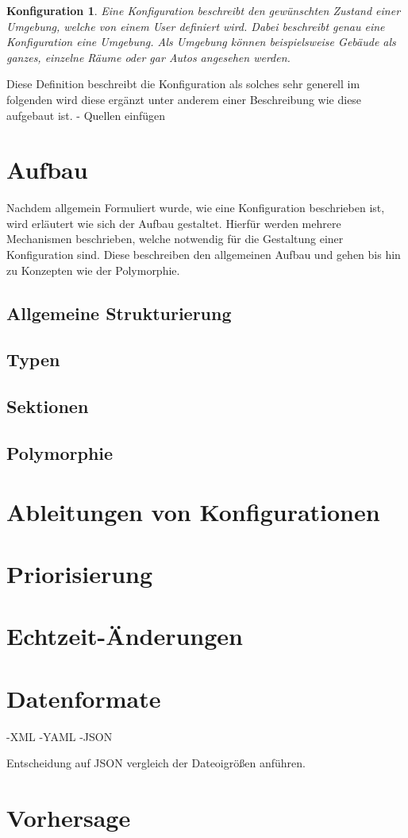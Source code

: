 \newtheorem{mydef}{Konfiguration}
\begin{mydef}
Eine Konfiguration beschreibt den gewünschten Zustand einer Umgebung, welche von einem User definiert wird. Dabei beschreibt genau eine Konfiguration eine Umgebung. Als
Umgebung können beispielsweise Gebäude als ganzes, einzelne Räume oder gar Autos angesehen werden.
\end{mydef}

Diese Definition beschreibt die Konfiguration als solches sehr generell im folgenden wird diese ergänzt unter anderem einer Beschreibung wie diese aufgebaut ist. 
- Quellen einfügen 

\section{Aufbau} 
Nachdem allgemein Formuliert wurde, wie eine Konfiguration beschrieben ist, wird erläutert wie sich der Aufbau gestaltet. Hierfür werden mehrere Mechanismen beschrieben, 
welche notwendig für die Gestaltung einer Konfiguration sind. Diese beschreiben den allgemeinen Aufbau und gehen bis hin zu Konzepten wie der Polymorphie. 


\subsection{Allgemeine Strukturierung}
\subsection{Typen}
\subsection{Sektionen}
\subsection{Polymorphie}

\section{Ableitungen von Konfigurationen} 

\section{Priorisierung}

\section{Echtzeit-Änderungen}

\section{Datenformate}
-XML
-YAML
-JSON 

Entscheidung auf JSON vergleich der Dateoigrößen anführen.




\section{Vorhersage}
